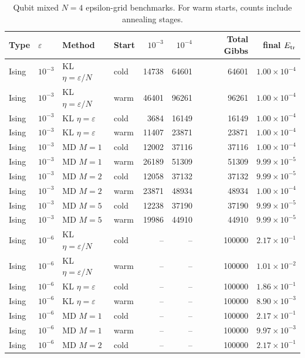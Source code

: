 \begin{table}[t]
\centering
\scriptsize
\caption{Qubit mixed $N=4$ epsilon-grid benchmarks. For warm starts, counts include annealing stages.}
\label{tab:0608-qubit-N4-eps-grid}
\begin{tabular}{llllrrrr}
\toprule
Type & $\varepsilon$ & Method & Start & $10^{-3}$ & $10^{-4}$ & Total Gibbs & final $E_{\rm tr}$ \\
\midrule
Ising & $10^{-3}$ & KL $\eta=\varepsilon/N$ & cold & 14738 & 64601 & 64601 & $1.00\times 10^{-4}$ \\
Ising & $10^{-3}$ & KL $\eta=\varepsilon/N$ & warm & 46401 & 96261 & 96261 & $1.00\times 10^{-4}$ \\
Ising & $10^{-3}$ & KL $\eta=\varepsilon$ & cold & 3684 & 16149 & 16149 & $1.00\times 10^{-4}$ \\
Ising & $10^{-3}$ & KL $\eta=\varepsilon$ & warm & 11407 & 23871 & 23871 & $1.00\times 10^{-4}$ \\
Ising & $10^{-3}$ & MD $M=1$ & cold & 12002 & 37116 & 37116 & $1.00\times 10^{-4}$ \\
Ising & $10^{-3}$ & MD $M=1$ & warm & 26189 & 51309 & 51309 & $9.99\times 10^{-5}$ \\
Ising & $10^{-3}$ & MD $M=2$ & cold & 12058 & 37132 & 37132 & $9.99\times 10^{-5}$ \\
Ising & $10^{-3}$ & MD $M=2$ & warm & 23871 & 48934 & 48934 & $1.00\times 10^{-4}$ \\
Ising & $10^{-3}$ & MD $M=5$ & cold & 12238 & 37190 & 37190 & $9.99\times 10^{-5}$ \\
Ising & $10^{-3}$ & MD $M=5$ & warm & 19986 & 44910 & 44910 & $9.99\times 10^{-5}$ \\
\midrule
Ising & $10^{-6}$ & KL $\eta=\varepsilon/N$ & cold & -- & -- & 100000 & $2.17\times 10^{-1}$ \\
Ising & $10^{-6}$ & KL $\eta=\varepsilon/N$ & warm & -- & -- & 100000 & $1.01\times 10^{-2}$ \\
Ising & $10^{-6}$ & KL $\eta=\varepsilon$ & cold & -- & -- & 100000 & $1.86\times 10^{-1}$ \\
Ising & $10^{-6}$ & KL $\eta=\varepsilon$ & warm & -- & -- & 100000 & $8.90\times 10^{-3}$ \\
Ising & $10^{-6}$ & MD $M=1$ & cold & -- & -- & 100000 & $2.17\times 10^{-1}$ \\
Ising & $10^{-6}$ & MD $M=1$ & warm & -- & -- & 100000 & $9.97\times 10^{-3}$ \\
Ising & $10^{-6}$ & MD $M=2$ & cold & -- & -- & 100000 & $2.17\times 10^{-1}$ \\

\end{tabular}
\end{table}
